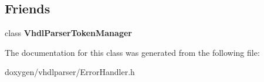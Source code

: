 \subsection*{Friends}
\begin{DoxyCompactItemize}
\item 
\mbox{\label{classvhdl_1_1parser_1_1_token_manager_error_handler_aff28441094086f5cbf8ee8f34a8bc9a4}} 
class {\bfseries Vhdl\+Parser\+Token\+Manager}
\end{DoxyCompactItemize}


The documentation for this class was generated from the following file\+:\begin{DoxyCompactItemize}
\item 
doxygen/vhdlparser/Error\+Handler.\+h\end{DoxyCompactItemize}
